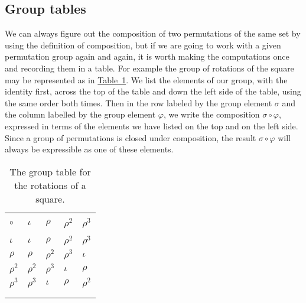 \documentclass[10pt,]{book}
\theoremstyle{plain}
\theoremstyle{definition}
\numberwithin{equation}{chapter}
\newcommand{\hrulethin}  {\noalign{\hrule height 0.04em}}
\begin{document}
\subsection[{Group tables}]{Group tables}\label{subsection-61}
We can always figure out the composition of two permutations of the same set by using the definition of composition, but if we are going to work with a given permutation group again and again, it is worth making the computations once and recording them in a table. For example the group of rotations of the square may be represented as in \hyperref[rotationgrouptable]{Table~\ref{rotationgrouptable}}. We list the elements of our group, with the identity first, across the top of the table and down the left side of the table, using the same order both times. Then in the row labeled by the group element \(\sigma\) and the column labelled by the group element \(\varphi\), we write the composition \(\sigma\circ \varphi\), expressed in terms of the elements we have listed on the top and on the left side. Since a group of permutations is closed under composition, the result \(\sigma\circ \varphi\) will always be expressible as one of these elements.%
\begin{table}
\centering
\begin{tabular}{lllll}
&&&&\tabularnewline\hrulethin
\(\circ\)&\(\iota\)&\(\rho\)&\(\rho^2\)&\(\rho^3\)\tabularnewline[0pt]
&&&&\tabularnewline\hrulethin
\(\iota\)&\(\iota\)&\(\rho\)&\(\rho^2\)&\(\rho^3\)\tabularnewline[0pt]
\(\rho\)&\(\rho\)&\(\rho^2\)&\(\rho^3\)&\(\iota\)\tabularnewline[0pt]
\(\rho^2\)&\(\rho^2\)&\(\rho^3\)&\(\iota\)&\(\rho\)\tabularnewline[0pt]
\(\rho^3\)&\(\rho^3\)&\(\iota\)&\(\rho\)&\(\rho^2\)\tabularnewline[0pt]
&&&&\tabularnewline\hrulethin
\end{tabular}
\caption{The group table for the rotations of a square.\label{rotationgrouptable}}
\end{table}
\end{document}
